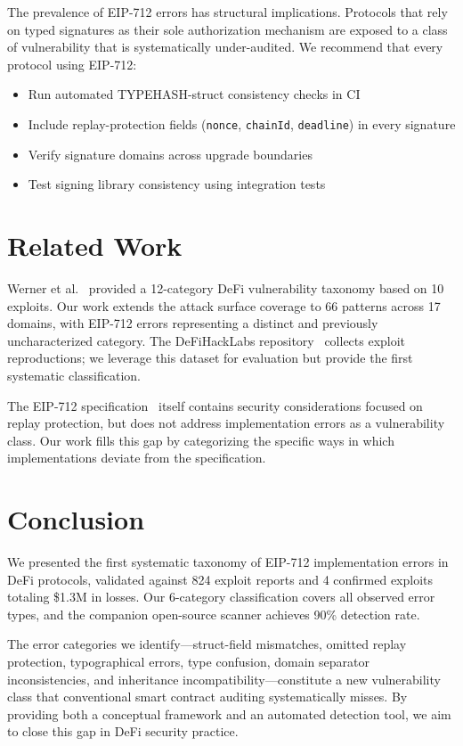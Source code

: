 \documentclass[runningheads]{llncs}
\begin{document}
The prevalence of EIP-712 errors has structural implications. Protocols that rely on typed signatures as their sole authorization mechanism are exposed to a class of vulnerability that is systematically under-audited. We recommend that every protocol using EIP-712:
\begin{itemize}
    \item Run automated TYPEHASH-struct consistency checks in CI
    \item Include replay-protection fields (\texttt{nonce}, \texttt{chainId}, \texttt{deadline}) in every signature
    \item Verify signature domains across upgrade boundaries
    \item Test signing library consistency using integration tests
\end{itemize}

\section{Related Work}

Werner et al.~\cite{werner2023} provided a 12-category DeFi vulnerability taxonomy based on 10 exploits. Our work extends the attack surface coverage to 66 patterns across 17 domains, with EIP-712 errors representing a distinct and previously uncharacterized category. The DeFiHackLabs repository~\cite{defihacklabs} collects exploit reproductions; we leverage this dataset for evaluation but provide the first systematic classification.

The EIP-712 specification~\cite{eip712} itself contains security considerations focused on replay protection, but does not address implementation errors as a vulnerability class. Our work fills this gap by categorizing the specific ways in which implementations deviate from the specification.

\section{Conclusion}

We presented the first systematic taxonomy of EIP-712 implementation errors in DeFi protocols, validated against 824 exploit reports and 4 confirmed exploits totaling \$1.3M in losses. Our 6-category classification covers all observed error types, and the companion open-source scanner achieves 90\% detection rate.

The error categories we identify---struct-field mismatches, omitted replay protection, typographical errors, type confusion, domain separator inconsistencies, and inheritance incompatibility---constitute a new vulnerability class that conventional smart contract auditing systematically misses. By providing both a conceptual framework and an automated detection tool, we aim to close this gap in DeFi security practice.
\end{document}
